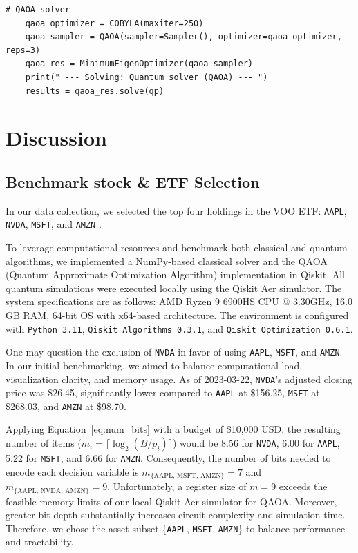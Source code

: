 \documentclass[12pt]{article}
\begin{document}
\begin{lstlisting}[style=pythonstyle, caption={QAOA solver}]
    # QAOA solver
    qaoa_optimizer = COBYLA(maxiter=250)
    qaoa_sampler = QAOA(sampler=Sampler(), optimizer=qaoa_optimizer, reps=3)
    qaoa_res = MinimumEigenOptimizer(qaoa_sampler)
    print(" --- Solving: Quantum solver (QAOA) --- ")
    results = qaoa_res.solve(qp)
\end{lstlisting}


\section{Discussion}
\subsection{Benchmark stock \& ETF Selection}
In our data collection, we selected the top four holdings in the VOO ETF: \texttt{AAPL}, \texttt{NVDA}, \texttt{MSFT}, and \texttt{AMZN} \cite{Vanguard_VOO}.

To leverage computational resources and benchmark both classical and quantum algorithms, we implemented a NumPy-based classical solver and the QAOA (Quantum Approximate Optimization Algorithm) implementation in Qiskit. All quantum simulations were executed locally using the Qiskit Aer simulator. The system specifications are as follows: AMD Ryzen 9 6900HS CPU @ 3.30GHz, 16.0 GB RAM, 64-bit OS with x64-based architecture. The environment is configured with \texttt{Python 3.11}, \texttt{Qiskit Algorithms 0.3.1}, and \texttt{Qiskit Optimization 0.6.1}.

One may question the exclusion of \texttt{NVDA} in favor of using \texttt{AAPL}, \texttt{MSFT}, and \texttt{AMZN}. In our initial benchmarking, we aimed to balance computational load, visualization clarity, and memory usage. As of 2023-03-22, \texttt{NVDA}'s adjusted closing price was \$26.45, significantly lower compared to \texttt{AAPL} at \$156.25, \texttt{MSFT} at \$268.03, and \texttt{AMZN} at \$98.70.

Applying Equation~\ref{eq:num_bits} with a budget of \$10{,}000 USD, the resulting number of items ($m_i = \lceil \log_2(B / p_i) \rceil$) would be 8.56 for \texttt{NVDA}, 6.00 for \texttt{AAPL}, 5.22 for \texttt{MSFT}, and 6.66 for \texttt{AMZN}. Consequently, the number of bits needed to encode each decision variable is $m_{\{\text{AAPL, MSFT, AMZN}\}} = 7$ and $m_{\{\text{AAPL, NVDA, AMZN}\}} = 9$. Unfortunately, a register size of $m = 9$ exceeds the feasible memory limits of our local Qiskit Aer simulator for QAOA. Moreover, greater bit depth substantially increases circuit complexity and simulation time. Therefore, we chose the asset subset \{\texttt{AAPL}, \texttt{MSFT}, \texttt{AMZN}\} to balance performance and tractability.
\end{document}

